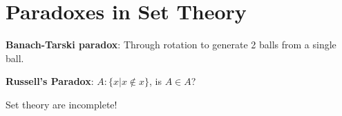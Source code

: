 \section{Paradoxes in Set Theory}

\textbf{Banach-Tarski paradox}: Through rotation to generate 2 balls
from a single ball.

\textbf{Russell's Paradox}: \(A : \{x | x \not \in x\}\), is
\(A \in A\)?

Set theory are incomplete!